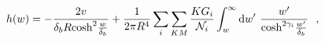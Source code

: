 \begin{equation}
h(w)=-\frac{2v}{\delta_b R{\rm cosh}^2\frac{w}{\delta_b}}
	+\frac{1}{2\pi R^4}\sum_i\sum_{KM}
	\frac{KG_i}{{\cal N}_i}\int_w^{\infty}{\rm d}w'~
		\frac{w'}{{\rm cosh}^{2\gamma_i}\frac{w'}{\delta_b}}~~,
\label{h.eqn2}
\end{equation}

